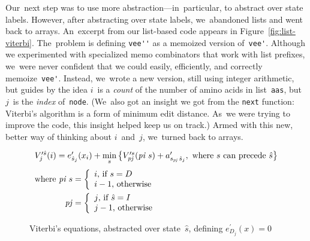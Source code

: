 \documentclass[]{jfp1}
\newcommand\figref[1]{Figure~\ref{fig:#1}}
\newcommand\figlabel[1]{\label{fig:#1}}
\begin{document}
Our~next step was to use more abstraction---in~particular, to abstract
over state labels.
However, after abstracting over state labels, we~abandoned lists and
went back to arrays.
An~excerpt from our list-based code appears in \figref{list-viterbi}.
The~problem is defining \verb+vee''+ as a memoized version
of~\verb+vee'+.
Although we experimented with specialized memo combinators that work
with list prefixes, 
we~were never confident that we could easily, efficiently, and
correctly memoize~\verb+vee'+.
Instead, we~wrote a new version, still using integer arithmetic, but
guides by the idea $i$~is a \emph{count} of the number
of amino acids in list~\texttt{aas}, but $j$~is the \emph{index}
of~\texttt{node}.
(We~also got
an
insight we got from
the \texttt{next} function: Viterbi's algorithm is a form of minimum edit
distance.
As~we were trying to improve the code, this insight helped keep us on track.)
Armed with this new, better way of thinking about $i$~and~$j$,
we~turned back to arrays.


\def\p#1{\mathit{p#1}}
\begin{figure}
\def\vsum#1#2{#1+#2}
\[
\begin{array}{r@{}c@{}l}
\multicolumn3{c}{
  V_{j}^{\prime \hat s}(i) = e^{\prime}_{\hat s_{j}}(x_{i}) 
    + \min\limits_s \big\{
         \vsum{V_{\mathit{\p j}}^{\prime s}(\p i\; s)} 
     {a^{\prime}_{s_{\p j} \,\hat s_j}}, 
      \mbox{ where $s$ can precede $\hat s$}  \big\}
}
\\[10pt]
\mbox{where }\p i\; s&{} = {}& 
  \left\{ \begin{array}{l}
          i \mbox{, if $s=D$}\\
          i-1 \mbox{, otherwise}\\
          \end{array}
  \right.
\\[10pt]
\p j &{} = {}& 
  \left\{ \begin{array}{l}
          j \mbox{, if $\hat s=I$}\\
          j-1 \mbox{, otherwise}\\
          \end{array}
  \right.
\\
\end{array}
\]

\caption{Viterbi's equations, abstracted over state~$\hat s$, 
defining $e^{\prime}_{D_j}(x) = 0$}
\figlabel{viterbi-abstracted}
\end{figure}
\end{document}
